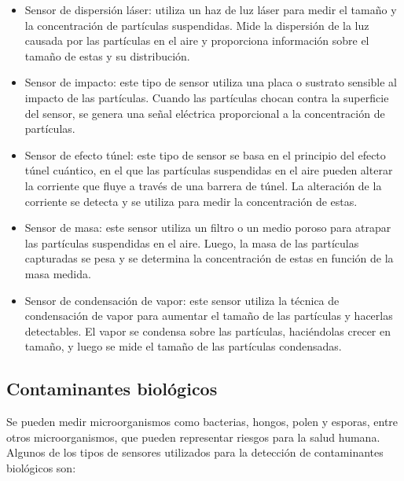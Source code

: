 \begin{itemize}
  \item Sensor de dispersión láser: utiliza un haz de luz láser para medir el tamaño y la concentración de partículas suspendidas. Mide la dispersión de la luz causada por las partículas en el aire y proporciona información sobre el tamaño de estas y su distribución.
  \item Sensor de impacto: este tipo de sensor utiliza una placa o sustrato sensible al impacto de las partículas. Cuando las partículas chocan contra la superficie del sensor, se genera una señal eléctrica proporcional a la concentración de partículas.
  \item Sensor de efecto túnel: este tipo de sensor se basa en el principio del efecto túnel cuántico, en el que las partículas suspendidas en el aire pueden alterar la corriente que fluye a través de una barrera de túnel. La alteración de la corriente se detecta y se utiliza para medir la concentración de estas.
  \item Sensor de masa: este sensor utiliza un filtro o un medio poroso para atrapar las partículas suspendidas en el aire. Luego, la masa de las partículas capturadas se pesa y se determina la concentración de estas en función de la masa medida.
  \item Sensor de condensación de vapor: este sensor utiliza la técnica de condensación de vapor para aumentar el tamaño de las partículas y hacerlas detectables. El vapor se condensa sobre las partículas, haciéndolas crecer en tamaño, y luego se mide el tamaño de las partículas condensadas.
\end{itemize}

\subsection{Contaminantes biológicos}

Se pueden medir microorganismos como bacterias, hongos, polen y esporas, entre otros microorganismos, que pueden representar riesgos para la salud humana. Algunos de los tipos de sensores utilizados para la detección de contaminantes biológicos son:

